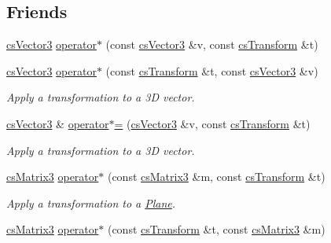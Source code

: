\subsection*{Friends}
\begin{DoxyCompactItemize}
\item 
\hyperlink{classcsVector3}{cs\+Vector3} \hyperlink{classcsTransform_ace54e0736582a671a04a33b79a5f6cce}{operator$\ast$} (const \hyperlink{classcsVector3}{cs\+Vector3} \&v, const \hyperlink{classcsTransform}{cs\+Transform} \&t)
\item 
\hyperlink{classcsVector3}{cs\+Vector3} \hyperlink{classcsTransform_a70e1d86872f3ed4561963a2bdfd01e8c}{operator$\ast$} (const \hyperlink{classcsTransform}{cs\+Transform} \&t, const \hyperlink{classcsVector3}{cs\+Vector3} \&v)\hypertarget{classcsTransform_a70e1d86872f3ed4561963a2bdfd01e8c}{}\label{classcsTransform_a70e1d86872f3ed4561963a2bdfd01e8c}

\begin{DoxyCompactList}\small\item\em Apply a transformation to a 3D vector. \end{DoxyCompactList}\item 
\hyperlink{classcsVector3}{cs\+Vector3} \& \hyperlink{classcsTransform_a5bdd4aee62548b5330d36a81cd417e49}{operator$\ast$=} (\hyperlink{classcsVector3}{cs\+Vector3} \&v, const \hyperlink{classcsTransform}{cs\+Transform} \&t)\hypertarget{classcsTransform_a5bdd4aee62548b5330d36a81cd417e49}{}\label{classcsTransform_a5bdd4aee62548b5330d36a81cd417e49}

\begin{DoxyCompactList}\small\item\em Apply a transformation to a 3D vector. \end{DoxyCompactList}\item 
\hyperlink{classcsMatrix3}{cs\+Matrix3} \hyperlink{classcsTransform_adde3b7d29bcb49e5ff6e1d01c39d7c29}{operator$\ast$} (const \hyperlink{classcsMatrix3}{cs\+Matrix3} \&m, const \hyperlink{classcsTransform}{cs\+Transform} \&t)
\begin{DoxyCompactList}\small\item\em Apply a transformation to a \hyperlink{classPlane}{Plane}. \end{DoxyCompactList}\item 
\hyperlink{classcsMatrix3}{cs\+Matrix3} \hyperlink{classcsTransform_a05d5caa141bd87b23486292cf724aa89}{operator$\ast$} (const \hyperlink{classcsTransform}{cs\+Transform} \&t, const \hyperlink{classcsMatrix3}{cs\+Matrix3} \&m)\hypertarget{classcsTransform_a05d5caa141bd87b23486292cf724aa89}{}\label{classcsTransform_a05d5caa141bd87b23486292cf724aa89}


\end{DoxyCompactItemize}
